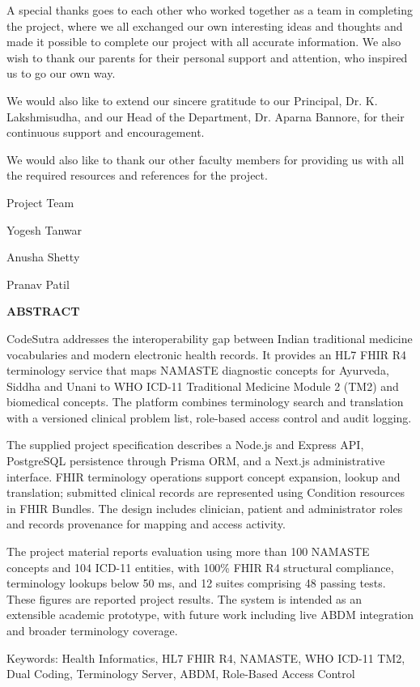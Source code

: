 \documentclass[12pt,a4paper,oneside]{report}
\begin{document}
A special thanks goes to each other who worked together as a team in completing the project, where we all exchanged our own interesting ideas and thoughts and made it possible to complete our project with all accurate information. We also wish to thank our parents for their personal support and attention, who inspired us to go our own way.

We would also like to extend our sincere gratitude to our Principal, Dr. K. Lakshmisudha, and our Head of the Department, Dr. Aparna Bannore, for their continuous support and encouragement.

We would also like to thank our other faculty members for providing us with all the required resources and references for the project.

Project Team

Yogesh Tanwar

Anusha Shetty

Pranav Patil

\clearpage
\begin{center}\textbf{ABSTRACT}\end{center}
CodeSutra addresses the interoperability gap between Indian traditional medicine vocabularies and modern electronic health records. It provides an HL7 FHIR R4 terminology service that maps NAMASTE diagnostic concepts for Ayurveda, Siddha and Unani to WHO ICD-11 Traditional Medicine Module 2 (TM2) and biomedical concepts. The platform combines terminology search and translation with a versioned clinical problem list, role-based access control and audit logging.

The supplied project specification describes a Node.js and Express API, PostgreSQL persistence through Prisma ORM, and a Next.js administrative interface. FHIR terminology operations support concept expansion, lookup and translation; submitted clinical records are represented using Condition resources in FHIR Bundles. The design includes clinician, patient and administrator roles and records provenance for mapping and access activity.

The project material reports evaluation using more than 100 NAMASTE concepts and 104 ICD-11 entities, with 100\% FHIR R4 structural compliance, terminology lookups below 50 ms, and 12 suites comprising 48 passing tests. These figures are reported project results. The system is intended as an extensible academic prototype, with future work including live ABDM integration and broader terminology coverage.

Keywords: Health Informatics, HL7 FHIR R4, NAMASTE, WHO ICD-11 TM2, Dual Coding, Terminology Server, ABDM, Role-Based Access Control
\end{document}
